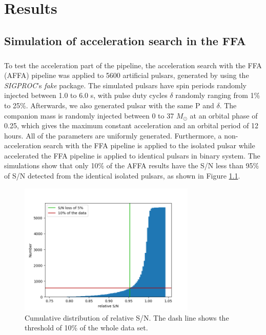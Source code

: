 \documentclass[thesis_msc.tex]{subfiles}
\begin{document}
\chapter{Results} \label{Chapter:result}
	\section{Simulation of acceleration search in the FFA } \label{AFFA}
  \paragraph{} To test the acceleration part of the pipeline, the  acceleration search with the FFA (AFFA) pipeline was applied to 5600 artificial pulsars, generated by using the \textit{SIGPROC}'s \textit{fake} package. The simulated pulsars have spin periods randomly injected between 1.0 to 6.0 s, with pulse duty cycles $\delta$ randomly ranging from 1\% to 25\%. Afterwards, we also generated pulsar with the same P and $\delta$. The companion mass is randomly injected between 0 to 37 $M_{\odot}$ at an orbital phase of 0.25, which gives the maximum constant acceleration and an orbital period of 12 hours. All of the parameters are uniformly generated. Furthermore, a non-acceleration search with the FFA pipeline is applied to the isolated pulsar while accelerated the FFA pipeline is applied to identical pulsars in binary system. The simulations show that only 10\% of the AFFA results have the S/N less than 95\% of S/N detected from the identical isolated pulsars, as shown in Figure \ref{his}.
  
  \begin{figure}[h]
\centering
\includegraphics[width=0.75\textwidth]{figures/dist_dash}
\caption{Cumulative distribution of relative S/N. The dash line shows the threshold of 10\% of the whole data set. }\label{his}
\end{figure}
\end{document}
